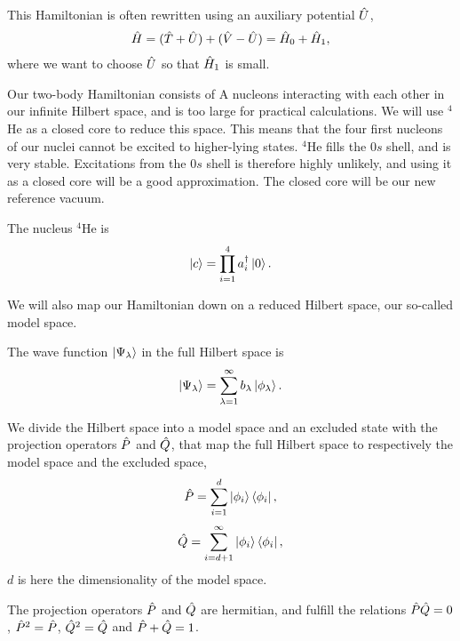 This Hamiltonian is often rewritten using an auxiliary potential $\hat{U}$,
\begin{align}
	\hat{H} = (\hat{T}+\hat{U}) + (\hat{V}-\hat{U}) = \hat{H}_0+\hat{H}_1,
\end{align}
where we want to choose $\hat{U}$ so that $\hat{H}_1$ is small. 

Our two-body Hamiltonian consists of A nucleons interacting with each other in
our infinite Hilbert space, and is too large for practical calculations. We
will use $^4$He as a closed core to reduce this space. This means that the four
first nucleons of our nuclei cannot be excited to higher-lying states. $^4$He
fills the $0s$ shell, and is very stable. Excitations from the $0s$ shell is
therefore highly unlikely, and using it as a closed core will be a good
approximation. The closed core will be our new reference vacuum.

The nucleus $^4$He is
\begin{align}
	\ket{c} = \prod_{i=1}^4a_i^\dagger\ket0.
	\label{eq:core}
\end{align}

We will also map our Hamiltonian down on a reduced Hilbert space, our so-called
model space.

The wave function $\left| \Psi_\lambda \right\rangle$ in the full Hilbert space is
\begin{align}
	\left| \Psi_\lambda \right\rangle = \sum_{\lambda=1}^\infty b_\lambda\left| \phi_\lambda \right\rangle.
\end{align}

We divide the Hilbert space into a model space and an excluded state with the
projection operators $\hat{P}$ and $\hat{Q}$, that map the full Hilbert space to
respectively the model space and the excluded space,
\begin{align}
	\hat{P} = \sum_{i=1}^d\left| \phi_i \right\rangle\left\langle \phi_i \right|,
\end{align}
\begin{align}
	\q = \sum_{i=d+1}^\infty\ket{\phi_i}\bra{\phi_i},
	\label{eq:Q}
\end{align}
$d$ is here the dimensionality of the model space.

The projection operators $\hat{P}$ and $\hat{Q}$ are hermitian, and fulfill the
relations $\hat{P}\hat{Q}=0$, $\hat{P}^2=\hat{P}$, $\hat{Q}^2=\hat{Q}$ and $\hat{P}+\hat{Q}=1$.


